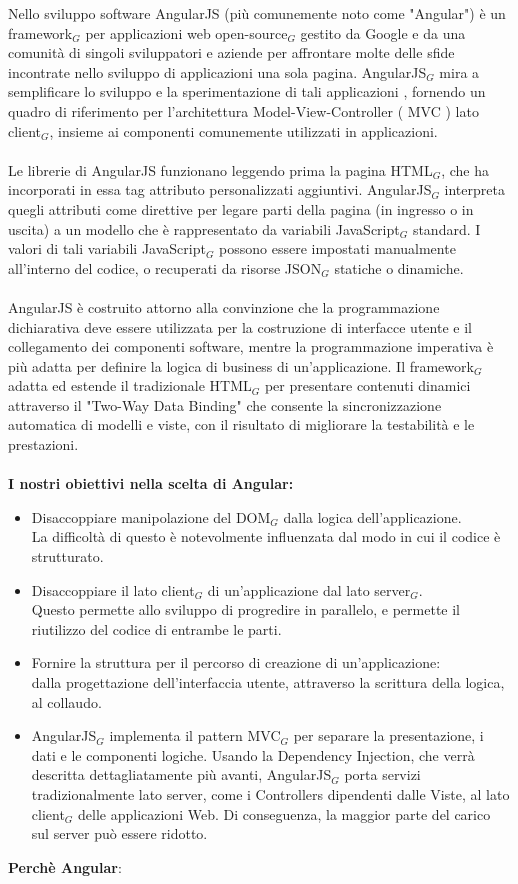 Nello sviluppo software AngularJS (più comunemente noto come "Angular") è un framework$_G$  per applicazioni web open-source$_G$ gestito da Google e da una comunità di singoli sviluppatori e aziende per affrontare molte delle sfide incontrate nello sviluppo di applicazioni una sola pagina. AngularJS$_G$ mira a 
semplificare lo sviluppo e la sperimentazione di tali applicazioni , fornendo un quadro di riferimento per l'architettura Model-View-Controller ( MVC ) lato client$_G$, insieme ai componenti comunemente utilizzati in applicazioni.\\
\\
Le librerie di AngularJS funzionano leggendo prima la pagina HTML$_G$, che ha incorporati in essa tag attributo personalizzati aggiuntivi. AngularJS$_G$ interpreta quegli attributi come direttive per legare parti della pagina (in ingresso o in uscita) a un modello che è rappresentato da variabili JavaScript$_G$ standard. I valori di tali variabili JavaScript$_G$ possono essere impostati manualmente all'interno del codice, o recuperati da risorse JSON$_G$ statiche o dinamiche.\\
\\
AngularJS è costruito attorno alla convinzione che la programmazione dichiarativa deve essere utilizzata per la costruzione di interfacce utente e il collegamento dei componenti software, mentre la programmazione imperativa è più adatta per definire la logica di business di un'applicazione. Il  framework$_G$ adatta ed estende il tradizionale HTML$_G$ per presentare contenuti dinamici attraverso il "Two-Way Data Binding" che consente la sincronizzazione automatica di modelli e viste, con il risultato di migliorare la testabilità e le prestazioni.\\
\\
\textbf{I nostri obiettivi nella scelta di Angular:
}
\begin{itemize}
	\item Disaccoppiare manipolazione del DOM$_G$ dalla logica dell'applicazione.\\
	La difficoltà di questo è notevolmente influenzata dal modo in cui il codice è strutturato.
	\item Disaccoppiare il lato client$_G$  di un'applicazione dal lato server$_G$.\\
	Questo permette allo sviluppo di progredire in parallelo, e permette il riutilizzo del codice di entrambe le parti.
	\item Fornire la struttura per il percorso di creazione di un'applicazione:\\
	dalla progettazione dell'interfaccia utente, attraverso la scrittura della logica, al collaudo.
	\item AngularJS$_G$ implementa il pattern MVC$_G$ per separare la presentazione, i dati e le componenti logiche. Usando la Dependency Injection, che verrà descritta dettagliatamente più avanti, AngularJS$_G$ porta servizi  tradizionalmente lato server, come i Controllers dipendenti dalle Viste, al lato client$_G$ delle applicazioni Web. Di conseguenza, la maggior parte del carico sul server può essere ridotto.
\end{itemize}
\textbf{Perchè Angular}:

